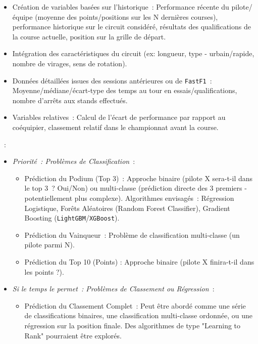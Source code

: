 \documentclass[11pt, a4paper]{article}
\newcommand{\lib}[1]{\texttt{#1}}
\begin{document}
\begin{description}[style=standard, itemsep=0.5em, leftmargin=1.5em]
\begin{itemize}[label=\textbullet, itemsep=0.2em, leftmargin=*]
        \item Création de variables basées sur l'historique~: Performance récente du pilote/équipe (moyenne des points/positions sur les N dernières courses), performance historique sur le circuit considéré, résultats des qualifications de la course actuelle, position sur la grille de départ.
        \item Intégration des caractéristiques du circuit (ex: longueur, type - urbain/rapide, nombre de virages, sens de rotation). %
        \item Données détaillées issues des sessions antérieures ou de \lib{FastF1}~: Moyenne/médiane/écart-type des temps au tour en essais/qualifications, nombre d'arrêts aux stands effectués. %
        \item Variables relatives~: Calcul de l'écart de performance par rapport au coéquipier, classement relatif dans le championnat avant la course.
    \end{itemize}
    \item[Modélisation (Machine Learning)]~:
    \begin{itemize}[label=\textbullet, itemsep=0.2em, leftmargin=*]
        \item \textit{Priorité~: Problèmes de Classification}~:
        \begin{itemize}[label=\textendash, itemsep=0.2em, leftmargin=*]
            \item Prédiction du Podium (Top 3)~: Approche binaire (pilote X sera-t-il dans le top 3~? Oui/Non) ou multi-classe (prédiction directe des 3 premiers - potentiellement plus complexe). Algorithmes envisagés~: Régression Logistique, Forêts Aléatoires (Random Forest Classifier), Gradient Boosting (\lib{LightGBM}/\lib{XGBoost}).
            \item Prédiction du Vainqueur~: Problème de classification multi-classe (un pilote parmi N).
            \item Prédiction du Top 10 (Points) : Approche binaire (pilote X finira-t-il dans les points ?).
        \end{itemize}
        \item \textit{Si le temps le permet~: Problèmes de Classement ou Régression}~:
         \begin{itemize}[label=\textendash, itemsep=0.2em, leftmargin=*]
            \item Prédiction du Classement Complet~: Peut être abordé comme une série de classifications binaires, une classification multi-classe ordonnée, ou une régression sur la position finale. Des algorithmes de type "Learning to Rank" pourraient être explorés.

\end{itemize}
\end{itemize}
\end{description}
\end{document}
